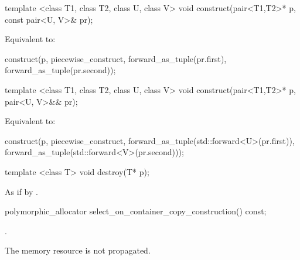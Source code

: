 %
\begin{itemdecl}
template <class T1, class T2, class U, class V>
  void construct(pair<T1,T2>* p, const pair<U, V>& pr);
\end{itemdecl}

\begin{itemdescr}
\pnum
\effects
Equivalent to:
\begin{codeblock}
construct(p, piecewise_construct,
          forward_as_tuple(pr.first),
          forward_as_tuple(pr.second));
\end{codeblock}
\end{itemdescr}

%
\begin{itemdecl}
template <class T1, class T2, class U, class V>
  void construct(pair<T1,T2>* p, pair<U, V>&& pr);
\end{itemdecl}

\begin{itemdescr}
\pnum
\effects
Equivalent to:
\begin{codeblock}
construct(p, piecewise_construct,
          forward_as_tuple(std::forward<U>(pr.first)),
          forward_as_tuple(std::forward<V>(pr.second)));
\end{codeblock}
\end{itemdescr}

%
\begin{itemdecl}
template <class T>
  void destroy(T* p);
\end{itemdecl}

\begin{itemdescr}
\pnum
\effects
As if by .
\end{itemdescr}

%
\begin{itemdecl}
polymorphic_allocator select_on_container_copy_construction() const;
\end{itemdecl}

\begin{itemdescr}
\pnum
\returns
{}.

\pnum
\begin{note}
The memory resource is not propagated.
\end{note}
\end{itemdescr}


